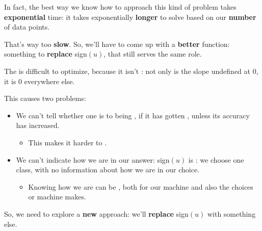         
        
        
        
        
        
        In fact, the best way we know how to approach this kind of problem takes \textbf{exponential} time: it takes exponentially \textbf{longer} to solve based on our \textbf{number} of data points.
        
        That's way too \textbf{slow}. So, we'll have to come up with a \textbf{better} function: something to \textbf{replace} sign$(u)$, that still serves the same role.\\
        
        \begin{concept}
            The  is difficult to optimize, because it isn't : not only is the slope undefined at 0, it is 0 everywhere else.
            
            This causes two problems:
            
            \begin{itemize}
                \item We can't tell whether one  is  to being , if it has gotten , unless its accuracy has increased. 
                    \begin{itemize}
                        \item This makes it harder to .
                    \end{itemize}
                
                \item We can't indicate how  we are in our answer: sign$(u)$ is : we choose one class, with no information about how  we are in our choice.
                    \begin{itemize}
                        \item Knowing how  we are can be , both for  our machine and also  the choices or machine makes.
                    \end{itemize}
            \end{itemize}
        \end{concept}
        
        So, we need to explore a \textbf{new} approach: we'll \textbf{replace} sign$(u)$ with something else.
    
